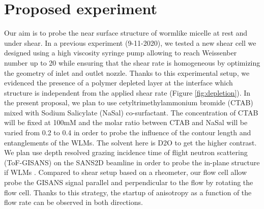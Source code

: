 \documentclass[12pt]{article}
\begin{document}
\section*{Proposed experiment}
Our aim is to probe the near surface structure of wormlike micelle at rest and under shear. In a previous experiment (9-11-2020), we tested a new shear cell we designed using a high viscosity syringe pump allowing to reach Weissenber number up to 20 while ensuring that the shear rate is homogeneous by optimizing the geometry of inlet and outlet nozzle. Thanks to this experimental setup, we evidenced the presence of a polymer depleted layer at the interface which structure is independent from the applied shear rate (Figure \ref{fig:depletion}). In the present proposal, we plan to use cetyltrimethylammonium bromide (CTAB) mixed with Sodium Salicylate (NaSal) co-surfactant. The concentration of CTAB will be fixed at 100mM and the molar ratio between CTAB and NaSal will be varied from 0.2 to 0.4 in order to probe the influence of the contour length and entanglements of the WLMs\cite{lutz-buenoViscoelasticityEnhancementSurfactant2016}. The solvent here is D2O to get the higher contrast. We plan use depth resolved grazing incidence time of flight neutron scattering (ToF-GISANS) on the SANS2D beamline in order to probe the in-plane structure if WLMs \cite{wolffDepthResolvedGrazing2014}. Compared to shear setup based on a rheometer, our flow cell allow probe the GISANS signal parallel and perpendicular to the flow by rotating the flow cell. Thanks to this strategy, the startup of anisotropy as a function of the flow rate can be observed in both directions.




\end{document}
